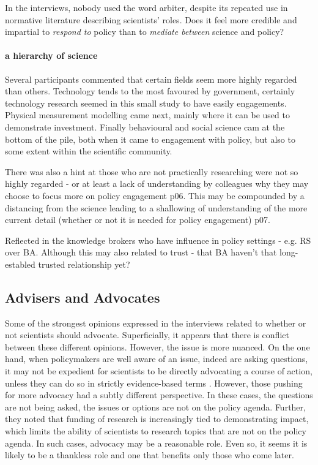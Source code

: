 In the interviews, nobody used the word arbiter, despite its repeated use in normative literature describing scientists' roles. 
Does it feel more credible and impartial to \emph{respond to} policy than  to \emph{mediate between} science and policy?


\paragraph{a hierarchy of science}
Several participants commented that certain fields seem more highly regarded than others. Technology tends to the most favoured by government, certainly technology research seemed in this small study to have easily engagements. Physical measurement modelling came next, mainly where it can be used to demonstrate investment. Finally behavioural and social science cam at the bottom of the pile, both when it came to engagement with policy, but also to some extent within the scientific community.

There was also a hint at those who are not practically researching were not so highly regarded - or at least a lack of understanding by colleagues why they may choose to focus more on policy engagement p06. This may be compounded by a distancing from the science leading to a shallowing of understanding of the more current detail (whether or not it is needed for policy engagement) p07. 

Reflected in the knowledge brokers who have influence in policy settings - e.g. RS over BA. Although this may also related to trust - that BA haven't that long-establed trusted relationship yet?

\subsection{Advisers and Advocates}\label{sec:disadvocacy}
Some of the strongest opinions expressed in the interviews related to whether or not scientists should advocate. Superficially, it appears that there is conflict between these different opinions. However, the issue is more nuanced. On the one hand, when policymakers are well aware of an issue, indeed are asking questions, it may not be expedient for scientists to be directly advocating a course of action, unless they can do so in strictly evidence-based terms %
. However, those pushing for more advocacy had a subtly different perspective. In these cases, the questions are not being asked, the issues or options are not on the policy agenda. Further, they noted that funding of research is increasingly tied to demonstrating impact, which limits the ability of scientists to research topics that are not on the policy agenda. In such cases, advocacy may be a reasonable role. Even so, it seems it is likely to be a thankless role and one that benefits only those who come later. 

